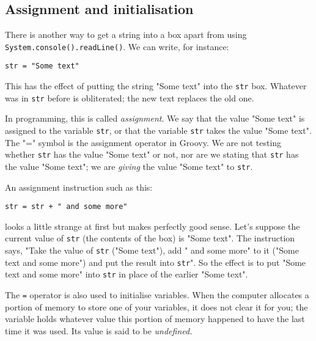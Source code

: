 
\subsection{Assignment and initialisation}

There is another way to get a string into a box apart from using
\verb!System.console().readLine()!.  We can write, for instance:

\begin{Verbatim}
str = "Some text"
\end{Verbatim}

This has the effect of putting the string "Some text" into the
\verb!str! box.  Whatever was in \verb!str! before is obliterated; the
new text replaces the old one. 

In programming, this is called \emph{assignment}.  We say that the
value "Some text" is
assigned to the variable \verb!str!, or that the variable \verb!str! takes the
value "Some text".  The "=" symbol is the assignment operator in Groovy.  We are not
testing whether \verb!str! has the value "Some text" or not, nor are we stating that
\verb!str! has the value "Some text"; we are \emph{giving} the value
"Some text" to \verb!str!.

%

An assignment instruction such as this:

\begin{Verbatim}
str = str + " and some more"
\end{Verbatim}

looks a little strange at first but makes perfectly good sense.
Let's suppose the current value of \verb!str! (the contents of the
box) is "Some text".
The instruction says, "Take the value of \verb!str!
("Some text"), add " and some more"  to it ("Some text and some
more") 
and put the result into \verb!str!".
So the effect is to put "Some text and some more" into \verb!str! in
place of the earlier "Some text".

The \verb!=! operator is also used to initialise variables.  When the computer
allocates a portion of memory to store one of your variables, it does not
clear it for you; the variable holds whatever value this portion of memory
happened to have the last time it was used.  Its value is said to be
\emph{undefined.}

